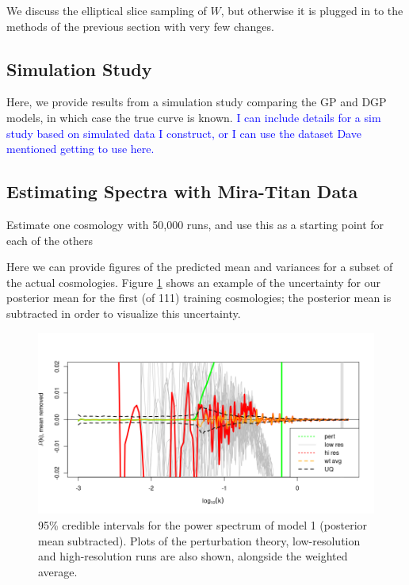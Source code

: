 \documentclass[11pt]{article}
\begin{document}
We discuss the elliptical slice sampling of $W$, but otherwise it is plugged in to the methods of the previous section with very few changes.

\subsection{Simulation Study}
\label{subsec:sim}

Here, we provide results from a simulation study comparing the GP and DGP models, in which case the true curve is known. \textcolor{blue}{I can include details for a sim study based on simulated data I construct, or I can use the dataset Dave mentioned getting to use here.}

\subsection{Estimating Spectra with Mira-Titan Data}
\label{subsec:mira_fit}

Estimate one cosmology with 50,000 runs, and use this as a starting point for each of the others

Here we can provide figures of the predicted mean and variances for a subset of the actual cosmologies. Figure \ref{fig:plot_fit} shows an example of the uncertainty for our posterior mean for the first (of 111) training cosmologies; the posterior mean is subtracted in order to visualize this uncertainty.

\begin{figure}[ht]
    \centering
    \includegraphics[width=6in]{plot_fit.png}
    \caption{95\% credible intervals for the power spectrum of model 1 (posterior mean subtracted). Plots of the perturbation theory, low-resolution and high-resolution runs are also shown, alongside the weighted average.}
    \label{fig:plot_fit}
\end{figure}
\end{document}
